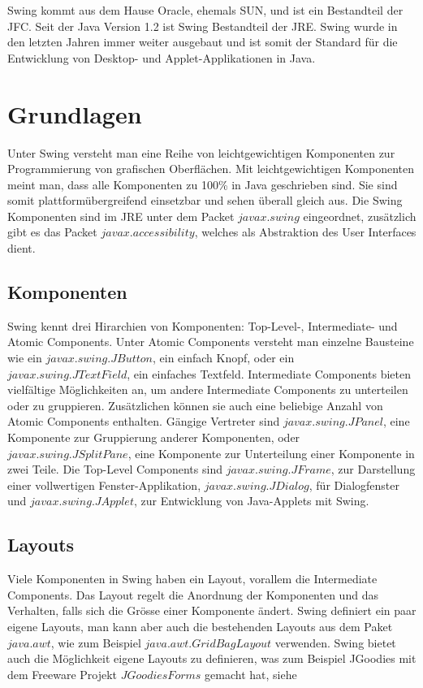   Swing kommt aus dem Hause Oracle, ehemals SUN, und ist ein Bestandteil der
  \ac{JFC}. Seit der Java Version 1.2 ist Swing Bestandteil der \ac{JRE}. Swing
  wurde in den letzten Jahren immer weiter ausgebaut und ist somit der Standard
  für die Entwicklung von Desktop- und Applet-Applikationen in Java.
  
  \section{Grundlagen}
  
  Unter Swing versteht man eine Reihe von leichtgewichtigen Komponenten zur
  Programmierung von grafischen Oberflächen. Mit leichtgewichtigen Komponenten
  meint man, dass alle Komponenten zu 100\% in Java geschrieben sind. Sie sind
  somit plattformübergreifend einsetzbar und sehen überall gleich aus. Die Swing
  Komponenten sind im \ac{JRE} unter dem Packet \(javax.swing\) eingeordnet,
  zusätzlich gibt es das Packet \(javax.accessibility\), welches als
  Abstraktion des User Interfaces dient.
  
  \subsection{Komponenten}
  
  Swing kennt drei Hirarchien von Komponenten: Top-Level-, Intermediate- und
  Atomic Components.
  Unter Atomic Components versteht man einzelne Bausteine wie ein
  \(javax.swing.JButton\), ein einfach Knopf, oder ein
  \(javax.swing.JTextField\), ein einfaches Textfeld.
  Intermediate Components bieten vielfältige Möglichkeiten an, um andere
  Intermediate Components zu unterteilen oder zu gruppieren. Zusätzlichen
  können sie auch eine beliebige Anzahl von Atomic Components enthalten. Gängige
  Vertreter sind \(javax.swing.JPanel\), eine Komponente zur Gruppierung anderer
  Komponenten, oder \(javax.swing.JSplitPane\), eine Komponente zur
  Unterteilung einer Komponente in zwei Teile.
  Die Top-Level Components sind \(javax.swing.JFrame\),
  zur Darstellung einer vollwertigen Fenster-Applikation,
  \(javax.swing.JDialog\), für Dialogfenster und \(javax.swing.JApplet\), zur
  Entwicklung von Java-Applets mit Swing.
  
  \subsection{Layouts}
  
  Viele Komponenten in Swing haben ein Layout, vorallem die Intermediate
  Components. Das Layout regelt die Anordnung der Komponenten und das Verhalten,
  falls sich die Grösse einer Komponente ändert. Swing definiert ein paar eigene
  Layouts, man kann aber auch die bestehenden Layouts aus dem Paket
  \(java.awt\), wie zum Beispiel \(java.awt.GridBagLayout\) verwenden. Swing
  bietet auch die Möglichkeit eigene Layouts zu definieren, was zum Beispiel
  JGoodies mit dem Freeware Projekt \(JGoodies Forms\) gemacht hat, siehe
  \cite{JGoodiesForms}
    
